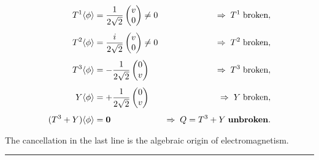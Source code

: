 \documentclass[12pt,a4paper]{article}
\begin{document}
\begin{align}
  T^1\langle\phi\rangle &= \frac{1}{2\sqrt{2}}\begin{pmatrix}v\\0\end{pmatrix} \neq 0
  &\Rightarrow\; T^1\;\text{broken} , \\[4pt]
  T^2\langle\phi\rangle &= \frac{i}{2\sqrt{2}}\begin{pmatrix}v\\0\end{pmatrix} \neq 0
  &\Rightarrow\; T^2\;\text{broken} , \\[4pt]
  T^3\langle\phi\rangle &= -\frac{1}{2\sqrt{2}}\begin{pmatrix}0\\v\end{pmatrix}
  &\Rightarrow\; T^3\;\text{broken} , \\[4pt]
  Y\langle\phi\rangle   &= +\frac{1}{2\sqrt{2}}\begin{pmatrix}0\\v\end{pmatrix}
  &\Rightarrow\; Y\;\text{broken} , \\[4pt]
  (T^3+Y)\langle\phi\rangle &= \mathbf{0}
  &\Rightarrow\; Q = T^3+Y\;\text{\textbf{unbroken}} .
\end{align}

The cancellation in the last line is the algebraic origin of electromagnetism.

\bigskip\hrule
\end{document}
